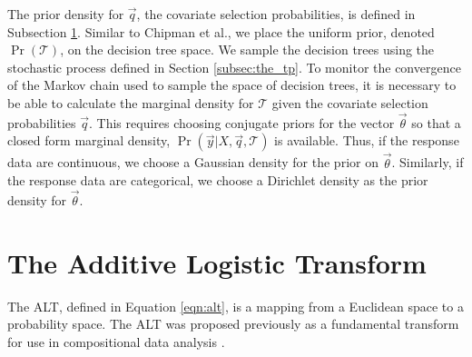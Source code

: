 The prior density for $\vec{q}$, the covariate selection probabilities, is defined in Subsection \ref{subsec:alt}. Similar to Chipman et al., we place the uniform prior, denoted $\Pr(\mathcal{T})$, on the decision tree space. We sample the decision trees using the stochastic process defined in Section \ref{subsec:the_tp}.  To monitor the convergence of the Markov chain used to sample the space of decision trees, it is necessary to be able to calculate the marginal density for $\mathcal{T}$ given the covariate selection probabilities $\vec{q}$. This requires choosing conjugate priors for the vector $\vec{\theta}$ so that a closed form marginal density, $\Pr(\vec{y}\vert X,\vec{q},\mathcal{T})$ is available. Thus, if the response data are continuous, we choose a Gaussian density for the prior on $\vec{\theta}$. Similarly, if the response data are categorical, we choose a Dirichlet density as the prior density for $\vec{\theta}$.  

	\section{The Additive Logistic Transform}\label{subsec:alt}
	
	The ALT, defined in Equation \ref{eqn:alt}, is a mapping from a Euclidean space to a probability space. 
	The ALT was proposed previously as a fundamental transform for use in compositional data analysis \cite{aitchison1986statistical}. 
	
